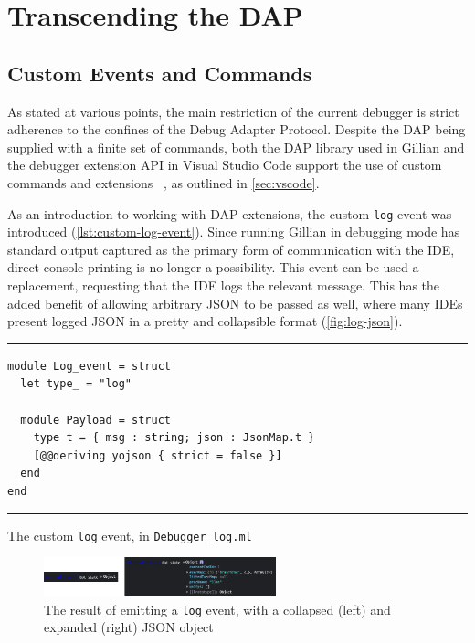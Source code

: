 
\section{Transcending the DAP}\label{sec:debug-interface}

\subsection{Custom Events and Commands}

As stated at various points, the main restriction of the current debugger is
strict adherence to the confines of the Debug Adapter Protocol. Despite the DAP
being supplied with a finite set of commands, both the DAP library used in
Gillian and the debugger extension API in Visual Studio Code support the use of
custom commands and extensions%
~\cite{ocaml-dap-custom, vscode-dap-custom-event, vscode-dap-custom-request}, as
outlined in \autoref{sec:vscode}.

As an introduction to working with DAP extensions, the custom \texttt{log} event
was introduced (\autoref{lst:custom-log-event}). Since running Gillian in
debugging mode has standard output captured as the primary form of communication
with the IDE, direct console printing is no longer a possibility. This event
can be used a replacement, requesting that the IDE logs the relevant message.
This has the added benefit of allowing arbitrary JSON to be passed as well,
where many IDEs present logged JSON in a pretty and collapsible format
(\autoref{fig:log-json}).

\begin{listing}[!ht]
\noindent\rule{\textwidth}{0.5pt}
\vspace{-0.6cm}
\begin{verbatim}
module Log_event = struct
  let type_ = "log"

  module Payload = struct
    type t = { msg : string; json : JsonMap.t }
    [@@deriving yojson { strict = false }]
  end
end
\end{verbatim}
\vspace{-0.4cm}
\noindent\rule{\textwidth}{0.5pt}
\vspace{-0.6cm}
\caption{The custom \texttt{log} event, in \texttt{Debugger\_log.ml}}
\label{lst:custom-log-event}
\end{listing}

\begin{figure}
  \center{}
  \includegraphics[width=0.6\textwidth]{img/log-json.png}
  \caption{
    The result of emitting a \texttt{log} event, with a collapsed (left) and
    expanded (right) JSON object}%
  \label{fig:log-json}
\end{figure}

